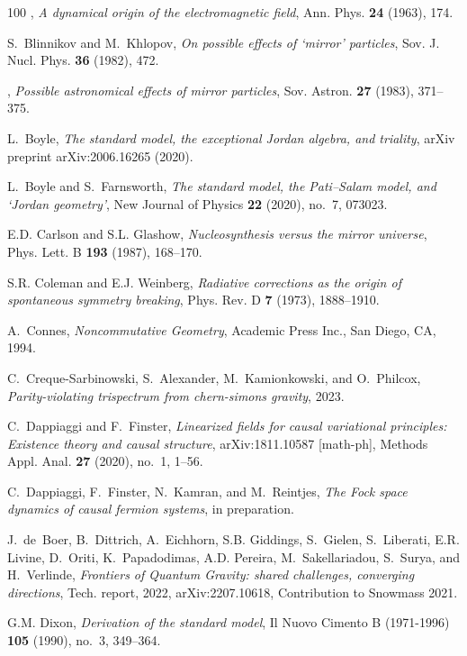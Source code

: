 \documentclass[reqno,11pt]{amsart}
\numberwithin{equation}{section}
\newcommand{\1}{\mbox{\rm 1 \hspace{-1.05 em} 1}}
\begin{document}
{\begin{thebibliography}{100}
\bysame, \emph{A dynamical origin of the electromagnetic field}, Ann. Phys.
  \textbf{24} (1963), 174.

S.~Blinnikov and M.~Khlopov, \emph{On possible effects of `mirror' particles},
  Sov. J. Nucl. Phys. \textbf{36} (1982), 472.

\bysame, \emph{Possible astronomical effects of mirror particles}, Sov. Astron.
  \textbf{27} (1983), 371--375.

L.~Boyle, \emph{The standard model, the exceptional {J}ordan algebra, and
  triality}, arXiv preprint arXiv:2006.16265 (2020).

L.~Boyle and S.~Farnsworth, \emph{{The standard model, the Pati--Salam model,
  and ‘Jordan geometry’}}, New Journal of Physics \textbf{22} (2020),
  no.~7, 073023.

E.D. Carlson and S.L. Glashow, \emph{Nucleosynthesis versus the mirror
  universe}, Phys. Lett. B \textbf{193} (1987), 168--170.

S.R. Coleman and E.J. Weinberg, \emph{Radiative corrections as the origin of
  spontaneous symmetry breaking}, Phys. Rev. D \textbf{7} (1973), 1888--1910.

A.~Connes, \emph{Noncommutative {G}eometry}, Academic Press Inc., San Diego,
  CA, 1994.

C.~Creque-Sarbinowski, S.~Alexander, M.~Kamionkowski, and O.~Philcox,
  \emph{Parity-violating trispectrum from chern-simons gravity}, 2023.

C.~Dappiaggi and F.~Finster, \emph{Linearized fields for causal variational
  principles: {E}xistence theory and causal structure}, arXiv:1811.10587
  [math-ph], Methods Appl. Anal. \textbf{27} (2020), no.~1, 1--56.

C.~Dappiaggi, F.~Finster, N.~Kamran, and M.~Reintjes, \emph{The {F}ock space
  dynamics of causal fermion systems}, in preparation.

J.~de~Boer, B.~Dittrich, A.~Eichhorn, S.B. Giddings, S.~Gielen, S.~Liberati,
  E.R. Livine, D.~Oriti, K.~Papadodimas, A.D. Pereira, M.~Sakellariadou,
  S.~Surya, and H.~Verlinde, \emph{{Frontiers of Quantum Gravity: shared
  challenges, converging directions}}, Tech. report, 2022, arXiv:2207.10618,
  Contribution to Snowmass 2021.

G.M. Dixon, \emph{Derivation of the standard model}, Il Nuovo Cimento B
  (1971-1996) \textbf{105} (1990), no.~3, 349--364.


\end{thebibliography}}
\end{document}
